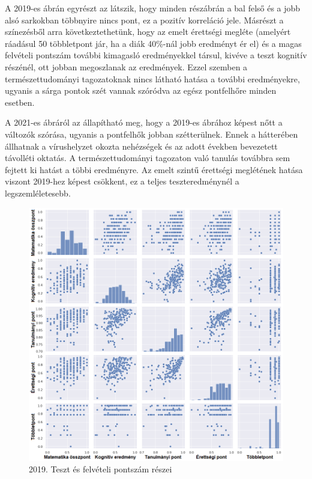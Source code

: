 \documentclass[12pt]{article}
\begin{document}
A 2019-es ábrán egyrészt az látszik, hogy minden részábrán a bal felső és a jobb alsó sarkokban többnyire nincs pont, ez a pozitív korreláció jele. Másrészt a színezésből arra következtethetünk, hogy az emelt érettségi megléte (amelyért ráadásul 50 többletpont jár, ha a diák 40\%-nál jobb eredményt ér el) és a magas felvételi pontszám további kimagasló eredményekkel társul, kivéve a teszt kognitív részénél, ott jobban megoszlanak az eredmények. Ezzel szemben a természettudományi tagozatoknak nincs látható hatása a további eredményekre, ugyanis a sárga pontok szét vannak szóródva az egész pontfelhőre minden esetben.

A 2021-es ábráról az állapítható meg, hogy a 2019-es ábrához képest nőtt a változók szórása, ugyanis a pontfelhők jobban szétterülnek. Ennek a hátterében állhatnak a vírushelyzet okozta nehézségek és az adott években bevezetett távolléti oktatás. A természettudományi tagozaton való tanulás továbbra sem fejtett ki hatást a többi eredményre. Az emelt szintű érettségi meglétének hatása viszont 2019-hez képest csökkent, ez a teljes teszteredménynél a legszemléletesebb.

\begin{figure}[H]
\centering
\includegraphics[width=\textwidth]{kepek/2019minmax3.png}
\caption{2019. Teszt és felvételi pontszám részei}
\label{fig:2019minmax3}
\end{figure}
\end{document}
